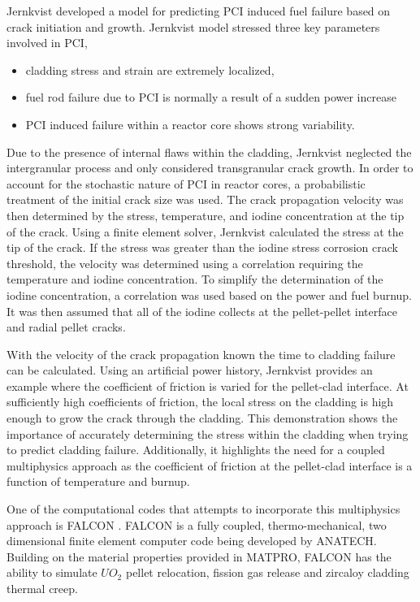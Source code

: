 \documentclass[edeposit,fullpage,11pt]{uiucthesis2009}
\begin{document}
Jernkvist \cite{jernkvist_model_1995} developed a model for predicting \gls{PCI} induced fuel failure based on crack initiation and growth.
Jernkvist model stressed three key parameters involved in \gls{PCI},
\begin{itemize} 
\item cladding stress and strain are extremely localized, 
\item fuel rod failure due to \gls{PCI} is normally a result of a sudden power increase 
\item \gls{PCI} induced failure within a reactor core shows strong variability.
\end{itemize}
Due to the presence of internal flaws within the cladding, Jernkvist neglected the intergranular process and only considered transgranular crack growth.
In order to account for the stochastic nature of \gls{PCI} in reactor cores, a probabilistic treatment of the initial crack size was used.
The crack propagation velocity was then determined by the stress, temperature, and iodine concentration at the tip of the crack.
Using a finite element solver, Jernkvist calculated the stress at the tip of the crack.
If the stress was greater than the iodine stress corrosion crack threshold, the velocity was determined using a correlation requiring the temperature and iodine concentration.
To simplify the determination of the iodine concentration, a correlation was used based on the power and fuel burnup.
It was then assumed that all of the iodine collects at the pellet-pellet interface and radial pellet cracks.

With the velocity of the crack propagation known the time to cladding failure can be calculated.
Using an artificial power history, Jernkvist provides an example where the coefficient of friction is varied for the pellet-clad interface.
At sufficiently high coefficients of friction, the local stress on the cladding is high enough to grow the crack through the cladding.
This demonstration shows the importance of accurately determining the stress within the cladding when trying to predict cladding failure.
Additionally, it highlights the need for a coupled multiphysics approach as the coefficient of friction at the pellet-clad interface is a function of temperature and burnup.

One of the computational codes that attempts to incorporate this multiphysics approach is FALCON \cite{montgomery_falcon_1997}.
FALCON is a fully coupled, thermo-mechanical, two dimensional finite element computer code being developed by ANATECH.
Building on the material properties provided in MATPRO, FALCON has the ability to simulate $UO_2$ pellet relocation, fission gas release and zircaloy cladding thermal creep.
\end{document}
